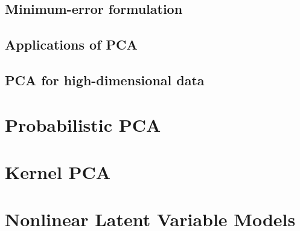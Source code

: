 \subsection{Minimum-error formulation}


\subsection{Applications of PCA}
\subsection{PCA for high-dimensional data}

\section{Probabilistic PCA}

\section{Kernel PCA}

\section{Nonlinear Latent Variable Models}
